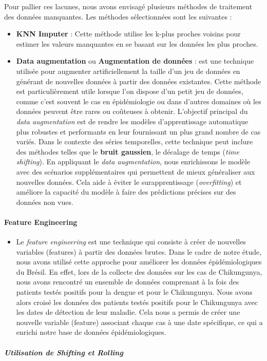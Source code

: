 Pour pallier ces lacunes, nous avons envisagé plusieurs méthodes de traitement des données manquantes. Les méthodes sélectionnées sont les suivantes :

\begin{itemize}
	\item \textbf{KNN Imputer} : Cette méthode utilise les k-plus proches voisins pour estimer les valeurs manquantes en se basant sur les données les plus proches.
	\item \textbf{Data  augmentation} ou \textbf{Augmentation de données} : est une technique utilisée pour augmenter artificiellement la taille d'un jeu de données en générant de nouvelles données à partir des données existantes. Cette méthode est particulièrement utile lorsque l'on dispose d'un petit jeu de données, comme c'est souvent le cas en épidémiologie ou dans d'autres domaines où les données peuvent être rares ou coûteuses à obtenir.	
	L'objectif principal du \textit{data augmentation} est de rendre les modèles d'apprentissage automatique plus robustes et performants en leur fournissant un plus grand nombre de cas variés. Dans le contexte des séries temporelles, cette technique peut inclure des méthodes telles que le \textbf{bruit gaussien}, le décalage de temps (\textit{time shifting}).
	En appliquant le \textit{data augmentation}, nous enrichissons le modèle avec des scénarios supplémentaires qui permettent de mieux généraliser aux nouvelles données. Cela aide à éviter le surapprentissage (\textit{overfitting}) et améliore la capacité du modèle à faire des prédictions précises sur des données non vues.
\end{itemize}
\newpage
\paragraph*{Feature Engineering}
\begin{itemize}
	\item[\space] Le \textit{feature engineering} est une technique qui consiste à créer de nouvelles variables (features) à partir des données brutes. Dans le cadre de notre étude, nous avons utilisé cette approche pour améliorer les données épidémiologiques du Brésil. En effet, lors de la collecte des données sur les cas de Chikungunya, nous avons rencontré un ensemble de données comprenant à la fois des patients testés positifs pour la dengue et pour le Chikungunya. Nous avons alors croisé les données des patients testés positifs pour le Chikungunya avec les dates de détection de leur maladie. Cela nous a permis de créer une nouvelle variable (feature) associant chaque cas à une date spécifique, ce qui a enrichi notre base de données épidémiologiques.
\end{itemize}
\subparagraph{Utilisation de Shifting et Rolling}


